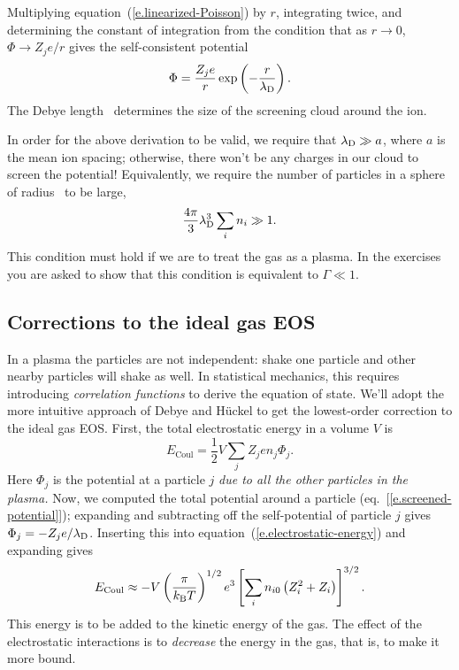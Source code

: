 Multiplying equation~(\ref{e.linearized-Poisson}) by $r$, integrating twice, and determining the constant of integration from the condition that as $r\to 0$, $\Phi \to Z_{j}e/r$ gives the self-consistent potential
\begin{equation}\label{e.screened-potential}
\Phi = \frac{Z_{j}e}{r}\exp\left(-\frac{r}{\lambda_{\mathrm{D}}}\right).
\end{equation}
The Debye length \lambdaD\ determines the size of the screening cloud around the ion.

In order for the above derivation to be valid, we require that $\lambda_{\mathrm{D}} \gg a$, where $a$ is the mean ion spacing; otherwise, there won't be any charges in our cloud to screen the potential! Equivalently, we require the number of particles in a sphere of radius \lambdaD\ to be large,
\begin{equation}\label{e.plasma-parameter}
\frac{4\pi}{3}\lambda_{\mathrm{D}}^{3} \sum_{i} n_{i} \gg 1.
\end{equation}
This condition must hold if we are to treat the gas as a plasma. In the exercises you are asked to show that this condition is equivalent to $\Gamma \ll 1$.

\subsection{Corrections to the ideal gas EOS}\label{s.plasma-corrections}

In a plasma the particles are not independent: shake one particle and other nearby particles will shake as well. In statistical mechanics, this requires introducing \emph{correlation functions} to derive the equation of state.  We'll adopt the more intuitive approach of Debye and H\"uckel to get the lowest-order correction to the ideal gas EOS.  First, the total electrostatic energy in a volume $V$ is
\begin{equation}\label{e.electrostatic-energy}
E_{\mathrm{Coul}} = \frac{1}{2}V\sum_{j}Z_{j}e n_{j}\Phi_{j}.
\end{equation}
Here $\Phi_{j}$ is the potential at a particle $j$ \emph{due to all the other particles in the plasma.}  Now, we computed the total potential around a particle (eq.~[\ref{e.screened-potential}]); expanding and subtracting off the self-potential of particle $j$ gives $\Phi_{j} = -Z_{j}e/\lambda_{\mathrm{D}}$.  Inserting this into equation~(\ref{e.electrostatic-energy}) and expanding gives
\begin{equation}\label{e.electrostatic-energy-2}
E_{\mathrm{Coul}} \approx - V\left(\frac{\pi}{k_\mathrm{B} T}\right)^{1/2} e^{3} \left[\sum_{i}n_{i0} \left(Z_{i}^{2} + Z_{i}\right)\right]^{3/2}.
\end{equation}
This energy is to be added to the kinetic energy of the gas.  The effect of the electrostatic interactions is to \emph{decrease} the energy in the gas, that is, to make it more bound.

